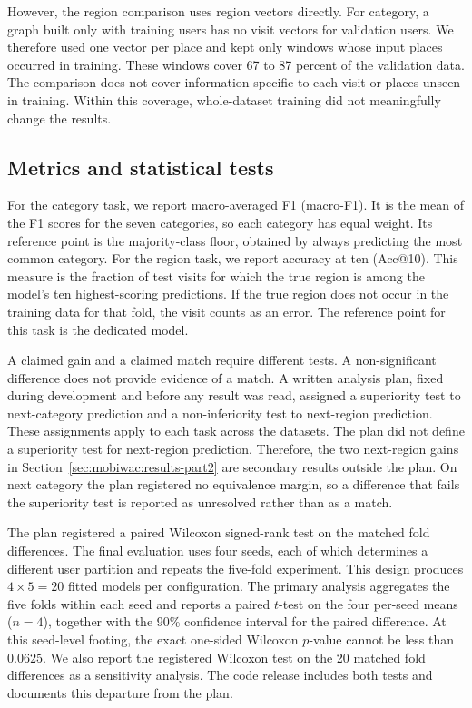 However, the region comparison uses region vectors directly. For category, a graph built only
with training users has no visit vectors for validation users. We therefore used one
vector per place and kept only windows whose input places occurred in training. These
windows cover 67 to 87 percent of the validation data. The comparison does not cover
information specific to each visit or places unseen in training. Within this
coverage, whole-dataset training did not meaningfully change the results.


\subsection{Metrics and statistical tests}
\label{sec:mobiwac:setup-metrics}
For the category task, we report macro-averaged F1 (macro-F1). It is the mean of the F1 scores for the seven categories, so each category has equal weight. Its reference point is the majority-class floor, obtained by always predicting the most common category. For the region task, we report accuracy at ten (Acc@10). This measure is the fraction of test visits for which the true region is among the model's ten highest-scoring predictions. If the true region does not occur in the training data for that fold, the visit counts as an error. The reference point for this task is the dedicated model.

A claimed gain and a claimed match require different tests. A non-significant difference does not provide evidence of a match. A written analysis plan, fixed during development and before any result was read, assigned a superiority test to next-category prediction and a non-inferiority test to next-region prediction. These assignments apply to each task across the datasets. The plan did not define a superiority test for next-region prediction. Therefore, the two next-region gains in Section~\ref{sec:mobiwac:results-part2} are secondary results outside the plan. On next category the plan registered no equivalence margin, so a difference that fails the superiority test is reported as unresolved rather than as a match.

The plan registered a paired Wilcoxon signed-rank test on the matched fold differences. The final evaluation uses four seeds, each of which determines a different user partition and repeats the five-fold experiment. This design produces $4\times5=20$ fitted models per configuration. The primary analysis aggregates the five folds within each seed and reports a paired $t$-test on the four per-seed means ($n{=}4$), together with the 90\% confidence interval for the paired difference. At this seed-level footing, the exact one-sided Wilcoxon $p$-value cannot be less than $0.0625$. We also report the registered Wilcoxon test on the 20 matched fold differences as a sensitivity analysis. The code release includes both tests and documents this departure from the plan.

